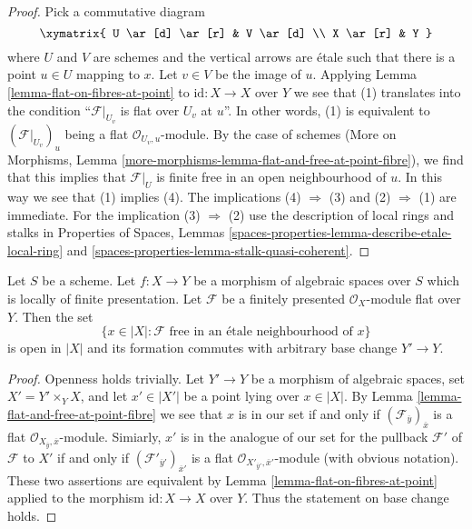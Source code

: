 \begin{proof}
Pick a commutative diagram
$$
\xymatrix{
U \ar[d] \ar[r] & V \ar[d] \\
X \ar[r] & Y
}
$$
where $U$ and $V$ are schemes and the vertical arrows are \'etale
such that there is a point $u \in U$ mapping to $x$. Let $v \in V$
be the image of $u$. Applying Lemma \ref{lemma-flat-on-fibres-at-point}
to $\text{id} : X \to X$ over $Y$ we see that (1) translates into
the condition ``$\mathcal{F}|_{U_v}$ is flat over $U_v$ at $u$''.
In other words, (1) is equivalent to $(\mathcal{F}|_{U_v})_u$
being a flat $\mathcal{O}_{U_v, u}$-module.
By the case of schemes (More on Morphisms, Lemma
\ref{more-morphisms-lemma-flat-and-free-at-point-fibre}),
we find that this implies that
$\mathcal{F}|_U$ is finite free in an open neighbourhood
of $u$. In this way we see that (1) implies (4).
The implications (4) $\Rightarrow$ (3) and
(2) $\Rightarrow$ (1) are immediate.
For the implication (3) $\Rightarrow$ (2) use
the description of local rings and stalks in
Properties of Spaces, Lemmas
\ref{spaces-properties-lemma-describe-etale-local-ring} and
\ref{spaces-properties-lemma-stalk-quasi-coherent}.
\end{proof}

\begin{lemma}
\label{lemma-finite-free-open}
Let $S$ be a scheme. Let $f : X \to Y$ be a morphism of algebraic spaces
over $S$ which is locally of finite presentation.
Let $\mathcal{F}$ be a finitely presented $\mathcal{O}_X$-module
flat over $Y$. Then the set
$$
\{x \in |X| : \mathcal{F}\text{ free in an \'etale neighbourhood of }x\}
$$
is open in $|X|$ and its formation commutes with arbitrary base change
$Y' \to Y$.
\end{lemma}

\begin{proof}
Openness holds trivially. Let $Y' \to Y$ be a morphism of algebraic spaces,
set $X' = Y' \times_Y X$, 
and let $x' \in |X'|$ be a point lying over $x \in |X|$.
By Lemma \ref{lemma-flat-and-free-at-point-fibre}
we see that $x$ is in our set if and only if
$(\mathcal{F}_{\overline{y}})_{\overline{x}}$ is a flat
$\mathcal{O}_{X_{\overline{y}}, \overline{x}}$-module.
Simiarly, $x'$ is in the analogue of our set for the pullback
$\mathcal{F}'$ of $\mathcal{F}$ to $X'$ if and only if
$(\mathcal{F}'_{\overline{y}'})_{\overline{x}'}$ is a flat
$\mathcal{O}_{X'_{\overline{y}'}, \overline{x}'}$-module
(with obvious notation). These two assertions are equivalent
by Lemma \ref{lemma-flat-on-fibres-at-point} applied to
the morphism $\text{id} : X \to X$ over $Y$.
Thus the statement on base change holds.
\end{proof}







